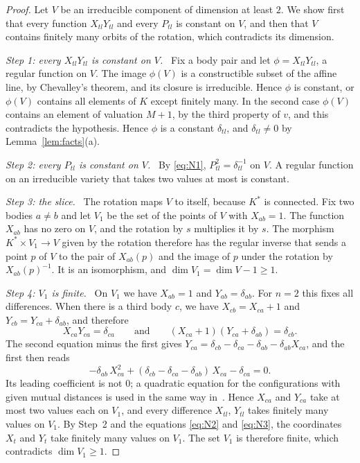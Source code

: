 \documentclass[11pt]{amsart}
\theoremstyle{definition}
\theoremstyle{remark}
\numberwithin{equation}{section}
\newcommand{\step}[1]{\smallskip\noindent\textit{#1}\ }
\begin{document}
\begin{proof}
Let $V$ be an irreducible component of dimension at least $2$. We show first that every function
$X_{tl} Y_{tl}$ and every $P_{tl}$ is constant on $V$, and then that $V$ contains finitely many orbits
of the rotation, which contradicts its dimension.

\step{Step 1: every $X_{tl} Y_{tl}$ is constant on $V$.} Fix a body pair and let $\phi = X_{tl} Y_{tl}$,
a regular function on $V$. The image $\phi(V)$ is a constructible subset of the affine line, by
Chevalley's theorem, and its closure is irreducible. Hence $\phi$ is constant, or $\phi(V)$ contains
all elements of $K$ except finitely many. In the second case $\phi(V)$ contains an element of valuation
$M + 1$, by the third property of $v$, and this contradicts the hypothesis. Hence $\phi$ is a constant
$\delta_{tl}$, and $\delta_{tl} \ne 0$ by Lemma~\ref{lem:facts}(a).

\step{Step 2: every $P_{tl}$ is constant on $V$.} By \eqref{eq:N1}, $P_{tl}^2 = \delta_{tl}^{-1}$ on
$V$. A regular function on an irreducible variety that takes two values at most is constant.

\step{Step 3: the slice.} The rotation maps $V$ to itself, because $K^{*}$ is connected. Fix two bodies
$a \ne b$ and let $V_1$ be the set of the points of $V$ with $X_{ab} = 1$. The function $X_{ab}$ has no zero on $V$, and the rotation by $s$ multiplies it by $s$. The morphism
$K^{*} \times V_1 \to V$ given by the rotation therefore has the regular inverse that sends a point $p$
of $V$ to the pair of $X_{ab}(p)$ and the image of $p$ under the rotation by $X_{ab}(p)^{-1}$. It is an
isomorphism, and $\dim V_1 = \dim V - 1 \ge 1$.

\step{Step 4: $V_1$ is finite.} On $V_1$ we have $X_{ab} = 1$ and $Y_{ab} = \delta_{ab}$. For $n = 2$
this fixes all differences. When there is a third body $c$, we have $X_{cb} = X_{ca} + 1$ and
$Y_{cb} = Y_{ca} + \delta_{ab}$, and therefore
\[
  X_{ca} Y_{ca} = \delta_{ca} \qquad\text{and}\qquad
  (X_{ca} + 1)(Y_{ca} + \delta_{ab}) = \delta_{cb} .
\]
The second equation minus the first gives
$Y_{ca} = \delta_{cb} - \delta_{ca} - \delta_{ab} - \delta_{ab} X_{ca}$, and the first then reads
\[
  -\delta_{ab}\, X_{ca}^2 + (\delta_{cb} - \delta_{ca} - \delta_{ab})\, X_{ca} - \delta_{ca} = 0 .
\]
Its leading coefficient is not $0$; a quadratic equation for the configurations with given mutual
distances is used in the same way in~\cite[\S 2.1]{tomar6}. Hence $X_{ca}$ and $Y_{ca}$ take at most
two values each on $V_1$,
and every difference $X_{tl}$, $Y_{tl}$ takes finitely many values on $V_1$. By Step~2 and the equations
\eqref{eq:N2} and \eqref{eq:N3}, the coordinates $X_t$ and $Y_t$ take finitely many values on $V_1$.
The set $V_1$ is therefore finite, which contradicts $\dim V_1 \ge 1$.
\end{proof}
\end{document}
